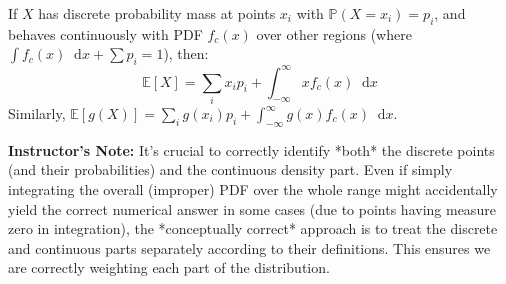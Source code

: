 \documentclass[11pt, letterpaper]{article}
\theoremstyle{plain} %
\theoremstyle{definition} %
\theoremstyle{remark} %
\newenvironment{instructorcomment}
  {\par\medskip\noindent\begin{framed}\textbf{Instructor's Note:} \normalfont}
  {\end{framed}\medskip}
\newcommand{\E}{\mathbb{E}}
\newcommand{\Prob}{\mathbb{P}}
\newcommand{\dee}{\mathop{}\!\mathrm{d}} %
\begin{document}
If $X$ has discrete probability mass at points $x_i$ with $\Prob(X=x_i) = p_i$, and behaves continuously with PDF $f_c(x)$ over other regions (where $\int f_c(x) \dee x + \sum p_i = 1$), then:
\[ \E[X] = \sum_i x_i p_i + \int_{-\infty}^{\infty} x f_c(x) \dee x \]
Similarly, $\E[g(X)] = \sum_i g(x_i) p_i + \int_{-\infty}^{\infty} g(x) f_c(x) \dee x$.

\begin{instructorcomment}
    It's crucial to correctly identify *both* the discrete points (and their probabilities) and the continuous density part. Even if simply integrating the overall (improper) PDF over the whole range might accidentally yield the correct numerical answer in some cases (due to points having measure zero in integration), the *conceptually correct* approach is to treat the discrete and continuous parts separately according to their definitions. This ensures we are correctly weighting each part of the distribution.
\end{instructorcomment}
\end{document}
